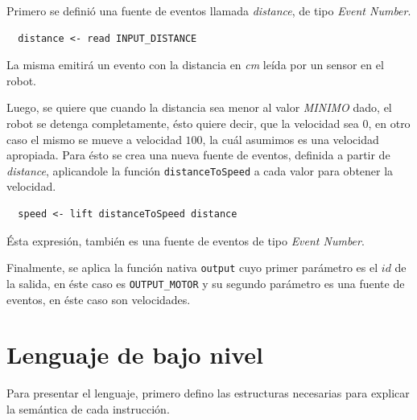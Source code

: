 Primero se definió una fuente de eventos llamada \emph{distance},
de tipo \emph{Event Number}.

\begin{verbatim}
  distance <- read INPUT_DISTANCE
\end{verbatim}

La misma emitirá un evento con la distancia en \emph{cm} leída
por un sensor en el robot.

  Luego, se quiere que cuando la distancia sea menor al valor
\emph{MINIMO} dado, el robot se detenga completamente, ésto
quiere decir, que la velocidad sea $0$, en otro caso el mismo
se mueve a velocidad $100$, la cuál asumimos es una velocidad
apropiada.
  Para ésto se crea una nueva fuente de eventos, definida a partir
de \emph{distance}, aplicandole la función \texttt{distanceToSpeed} 
a cada valor para obtener la velocidad.

\begin{verbatim}
  speed <- lift distanceToSpeed distance
\end{verbatim}

  Ésta expresión, también es una fuente de eventos
de tipo \emph{Event Number}.

  Finalmente, se aplica la función nativa \texttt{output} cuyo
primer parámetro es el $id$ de la salida, en éste caso es \texttt{OUTPUT\_MOTOR}
y su segundo parámetro es una fuente de eventos,
en éste caso son velocidades.


\section{Lenguaje de bajo nivel}

  Para presentar el lenguaje, primero defino las estructuras
necesarias para explicar la semántica de cada instrucción.

